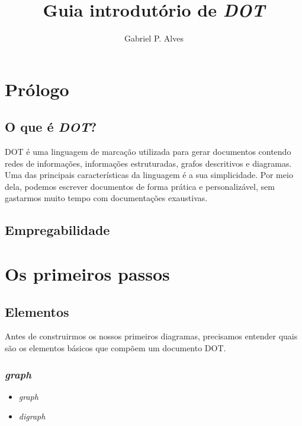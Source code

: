 \documentclass[a4paper,12pt]{article}
\begin{document}
  \title{\vspace{-0.5in} Guia introdutório de \emph{DOT}}
  \author{Gabriel P. Alves}
  \maketitle

  \section{Prólogo}

    \subsection{O que é \emph{DOT}?}
      DOT é uma linguagem de marcação utilizada para gerar
      documentos contendo redes de informações, informações
      estruturadas, grafos descritivos e diagramas.
%
      Uma das principais características da linguagem é a sua
      simplicidade. Por meio dela, podemos escrever documentos
      de forma prática e personalizável, sem gastarmos muito
      tempo com documentações exaustivas.


    \subsection{Empregabilidade}
    \break

  \section{Os primeiros passos}

    \subsection{Elementos}
      Antes de construirmos os nossos primeiros diagramas,
      precisamos entender quais são os elementos básicos
      que compõem um documento DOT.

      \subsubsection{\emph{graph}}

        \begin{itemize}

          \item{\emph{graph}}

          \item{\emph{digraph}}

        \end{itemize}
\end{document}
